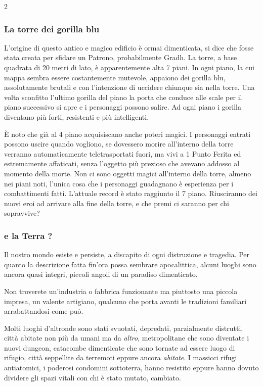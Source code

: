 \begin{multicols}{2}

\subsubsection{La torre dei gorilla blu}

L'origine di questo antico e magico edificio è ormai dimenticata, si dice che fosse stata creata per sfidare un Patrono, probabilmente Gradh. La torre, a base quadrata di 20 metri di lato, è apparentemente alta 7 piani. In ogni piano, la cui mappa sembra essere costantemente mutevole, appaiono dei gorilla blu, assolutamente brutali e con l'intenzione di uccidere chiunque sia nella torre. Una volta sconfitto l'ultimo gorilla del piano la porta che conduce alle scale per il piano successivo si apre e i personaggi possono salire. Ad ogni piano i gorilla diventano più forti, resistenti e più intelligenti.

È noto che già al 4 piano acquisiscano anche poteri magici. I personaggi entrati possono uscire quando vogliono, se dovessero morire all'interno della torre verranno automaticamente teletrasportati fuori, ma vivi a 1 Punto Ferita ed estremamente affaticati, senza l'oggetto più prezioso che avevano addosso al momento della morte. Non ci sono oggetti magici all'interno della torre, almeno nei piani noti, l'unica cosa che i personaggi guadagnano è esperienza per i combattimenti fatti. L'attuale record è stato raggiunto il 7 piano. Riusciranno dei nuovi eroi ad arrivare alla fine della torre, e che premi ci saranno per chi sopravvive?

\subsubsection{e la Terra ?}

Il nostro mondo esiste e persiste, a discapito di ogni distruzione e tragedia. Per quanto la descrizione fatta fin'ora possa sembrare apocalittica, alcuni luoghi sono ancora quasi integri, piccoli angoli di un paradiso dimenticato.

Non troverete un'industria o fabbrica funzionante ma piuttosto una piccola impresa, un valente artigiano, qualcuno che porta avanti le tradizioni familiari arrabattandosi come può.

Molti luoghi d'altronde sono stati svuotati, depredati, parzialmente distrutti, città abitate non più da umani ma da \emph{altro}, metropolitane che sono diventate i nuovi dungeon, catacombe dimenticate che sono tornate ad essere luogo di rifugio, città seppellite da terremoti eppure ancora \emph{abitate}. I massicci rifugi antiatomici, i poderosi condomini sottoterra, hanno resistito eppure hanno dovuto dividere gli spazi vitali con chi è stato mutato, cambiato.


\end{multicols}
